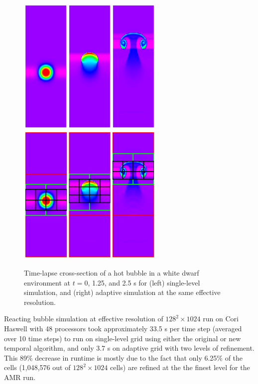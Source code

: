 \begin{figure}[htb]
\begin{center}
\includegraphics[width=2.75in]{./figs/reacting_bubble_result} 
$\qquad$
\includegraphics[width=2.75in]{./figs/reacting_bubble_amr_result}
\caption{\label{fig:bubble_results} Time-lapse cross-section of a hot bubble in a white dwarf environment at 
         $t = 0$, 1.25, and 2.5 s for (left) single-level simulation, and 
         (right) adaptive simulation at the same effective resolution.}
\end{center}
\end{figure}

Reacting bubble simulation at effective resolution of $128^2 \times 1024$ run on Cori Haswell with 48 processors took approximately 33.5 s per time step (averaged over 10 time steps) to run on single-level grid using either the original or new temporal algorithm, and only 3.7 s on adaptive grid with two levels of refinement. This 89\% decrease in runtime is mostly due to the fact that only 6.25\% of the cells (1,048,576 out of $128^2 \times 1024$ cells) are refined at the the finest level for the AMR run. 




